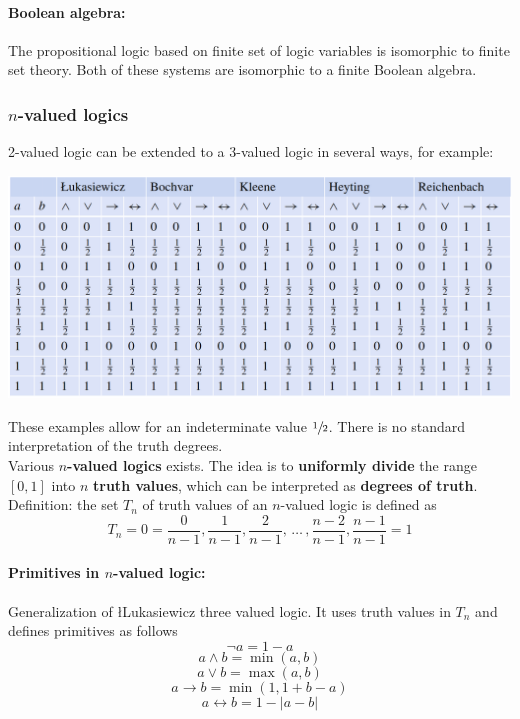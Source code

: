 \paragraph{Boolean algebra:} The propositional logic based on finite set of logic variables is isomorphic to finite set theory. Both of these systems are isomorphic to a finite Boolean algebra. %

\newpage

\subsubsection{$n$-valued logics}

2-valued logic can be extended to a 3-valued logic in several ways, for example: 
\begin{center}
	\includegraphics[width=0.95\columnwidth]{img/FS/nlogic}
\end{center}
These examples allow for an indeterminate value $\sfrac{1}{2}$. There is no standard interpretation of the truth degrees.\\

Various \textbf{$n$-valued logics} exists. The idea is to \textbf{uniformly divide} the range $[0,1]$ into $n$ \textbf{truth values}, which can be interpreted as \textbf{degrees of truth}. Definition: the set $T_n$ of truth values of an $n$-valued logic is defined as
$$ T_n = {0 = \frac{0}{n-1}, \frac{1}{n-1}, \frac{2}{n-1}, \, \dots \, , \frac{n-2}{n-1}, \frac{n-1}{n-1} = 1} $$

\paragraph{Primitives in $n$-valued logic:} Generalization of \l{L}ukasiewicz three valued logic. It uses truth values in $T_n$ and defines primitives as follows
$$ \neg a = 1 - a $$
$$ a \wedge b = \min (a,b) $$
$$ a \vee b = \max(a,b) $$
$$ a \rightarrow b = \min(1, 1 + b - a) $$
$$ a \leftrightarrow b = 1 - |a - b| $$

